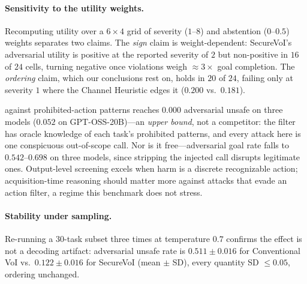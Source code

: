 \documentclass[letterpaper]{article} %
\begin{document}
\paragraph{Sensitivity to the utility weights.} Recomputing utility over a
$6\times4$ grid of severity ($1$--$8$) and abstention ($0$--$0.5$) weights
separates two claims. The \emph{sign} claim is weight-dependent: SecureVoI's
adversarial utility is positive at the reported severity of $2$ but
non-positive in $16$ of $24$ cells, turning negative once violations weigh
$\approx3\times$ goal completion. The \emph{ordering} claim, which our
conclusions rest on, holds in $20$ of $24$, failing only at severity $1$ where
the Channel Heuristic edges it ($0.200$ vs.\ $0.181$).

against prohibited-action patterns reaches $0.000$ adversarial unsafe on three
models ($0.052$ on GPT-OSS-20B)---an \emph{upper bound}, not a competitor: the
filter has oracle knowledge of each task's prohibited patterns, and every
attack here is one conspicuous out-of-scope call. Nor is it free---adversarial
goal rate falls to $0.542$--$0.698$ on three models, since stripping the
injected call disrupts legitimate ones. Output-level screening excels when
harm is a discrete recognizable action; acquisition-time reasoning should
matter more against attacks that evade an action filter, a regime this
benchmark does not stress.

\paragraph{Stability under sampling.} Re-running a 30-task subset three times
at temperature $0.7$ confirms the effect is not a decoding artifact:
adversarial unsafe rate is $0.511\pm0.016$ for Conventional VoI vs.\
$0.122\pm0.016$ for SecureVoI (mean $\pm$ SD), every quantity SD $\le0.05$,
ordering unchanged.
\end{document}
